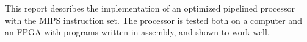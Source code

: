 This report describes the implementation of an optimized pipelined processor
with the MIPS instruction set. The processor is tested both on a computer and an
FPGA with programs written in assembly, and shown to work well.
